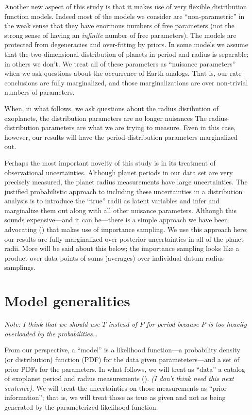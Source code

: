 \documentclass[12pt,preprint]{aastex}
\begin{document}
Another new aspect of this study is that it makes use of very flexible
distribution function models.
Indeed most of the models we consider are ``non-parametric'' in the weak sense
that they have enormous numbers of free parameters (not the strong sense of
having an \emph{infinite} number of free parameters).
The models are protected from degeneracies and over-fitting by priors.
In some models we assume that the two-dimensional distribution of planets in
period and radius is separable; in others we don't.
We treat all of these parameters as ``nuisance parameters'' when we ask
questions about the occurrence of Earth analogs.
That is, our rate conclusions are fully marginalized, and those
marginalizations are over non-trivial numbers of parameters.

When, in what follows, we ask questions about the radius disribution of
exoplanets, the distribution parameters are no longer nuisances The
radius-distribution parameters are what we are trying to measure.
Even in this case, however, our results will have the period-distribution
parameters marginalized out.

Perhaps the most important novelty of this study is in its treatment of
observational uncertainties.
Although planet periods in our data set are very precisely measured, the
planet radius measurements have large uncertainties.
The justified probabilistic approach to including these uncertainties in a
distribution analysis is to introduce the ``true'' radii as latent variables
and infer and marginalize them out along with all other nuisance parameters.
Although this sounds expensive---and it can be---there is a simple approach
we have been advocating (\cite{hogge}) that makes use of importance sampling.
We use this approach here; our results are fully marginalized over posterior
uncertainties in all of the planet radii.
More will be said about this below; the importance sampling looks like a
product over data points of sums (averages) over individual-datum radius
samplings.

\section{Model generalities}

\emph{Note: I think that we should use $T$ instead of $P$ for period because
$P$ is too heavily overloaded by the probabilities\ldots}

From our perspective, a ``model'' is a likelihood function---a probability
density (or distribution) function (PDF) for the data given
parameteters---and a set of prior PDFs for the parameters.
In what follows, we will treat as ``data'' a catalog of exoplanet period
and radius measurements (\citealt{petigura}).
\emph{(I don't think need this next sentence).}
We will treat the uncertainties on those measurements as ``prior
information''; that is, we will treat those as true as given and not as being
generated by the parameterized likelihood function.
\end{document}
